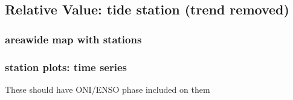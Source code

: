 \documentclass[letterpaper,10pt,english]{jupyterBook}
\begin{document}
\subsection{Relative Value: tide station (trend removed)}
\label{\detokenize{notebooks/regional_and_local/SL_anomaly_intra-annual:relative-value-tide-station-trend-removed}}

\subsubsection{area\sphinxhyphen{}wide map with stations}
\label{\detokenize{notebooks/regional_and_local/SL_anomaly_intra-annual:area-wide-map-with-stations}}

\subsubsection{station plots: time series}
\label{\detokenize{notebooks/regional_and_local/SL_anomaly_intra-annual:station-plots-time-series}}
\sphinxAtStartPar
These should have ONI/ENSO phase included on them
\end{document}
